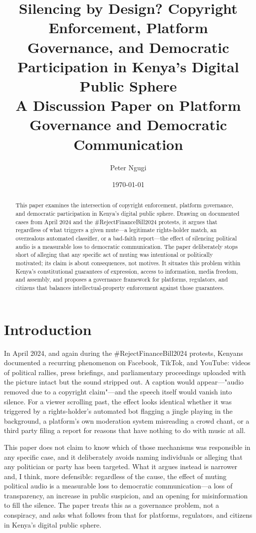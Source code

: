 \documentclass{article}
\title{Silencing by Design? Copyright Enforcement, Platform Governance, and Democratic Participation in Kenya's Digital Public Sphere \\
A Discussion Paper on Platform Governance and Democratic Communication}
\author{Peter Ngugi}
\date{\today}
\begin{document}
\maketitle

\begin{abstract}
This paper examines the intersection of copyright enforcement, platform governance, and democratic participation in Kenya's digital public sphere. Drawing on documented cases from April 2024 and the \#RejectFinanceBill2024 protests, it argues that regardless of what triggers a given mute—a legitimate rights-holder match, an overzealous automated classifier, or a bad-faith report—the effect of silencing political audio is a measurable loss to democratic communication. The paper deliberately stops short of alleging that any specific act of muting was intentional or politically motivated; its claim is about consequences, not motives. It situates this problem within Kenya's constitutional guarantees of expression, access to information, media freedom, and assembly, and proposes a governance framework for platforms, regulators, and citizens that balances intellectual-property enforcement against those guarantees.
\end{abstract}

\section{Introduction}

In April 2024, and again during the \#RejectFinanceBill2024 protests, Kenyans documented a recurring phenomenon on Facebook, TikTok, and YouTube: videos of political rallies, press briefings, and parliamentary proceedings uploaded with the picture intact but the sound stripped out. A caption would appear—"audio removed due to a copyright claim"—and the speech itself would vanish into silence. For a viewer scrolling past, the effect looks identical whether it was triggered by a rights-holder's automated bot flagging a jingle playing in the background, a platform's own moderation system misreading a crowd chant, or a third party filing a report for reasons that have nothing to do with music at all.

This paper does not claim to know which of those mechanisms was responsible in any specific case, and it deliberately avoids naming individuals or alleging that any politician or party has been targeted. What it argues instead is narrower and, I think, more defensible: regardless of the cause, the effect of muting political audio is a measurable loss to democratic communication—a loss of transparency, an increase in public suspicion, and an opening for misinformation to fill the silence. The paper treats this as a governance problem, not a conspiracy, and asks what follows from that for platforms, regulators, and citizens in Kenya's digital public sphere.
\end{document}
